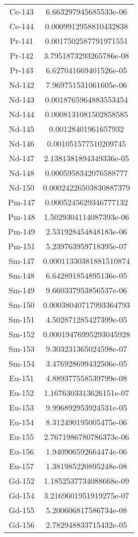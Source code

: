 \begin{table}[h!]
\begin{tabular}{|| c || c |}
Ce-143 & 6.663297945685533e-06 \\
Ce-144 & 0.0009912958810432838 \\
Pr-141 & 0.0017502587791971551 \\
Pr-142 & 3.7951873293265786e-08 \\
Pr-143 & 6.627041669401526e-05 \\
Nd-142 & 7.969751531061605e-06 \\
Nd-143 & 0.0018765964883553454 \\
Nd-144 & 0.0008131081502858585 \\
Nd-145 & 0.00128401961657932 \\
Nd-146 & 0.001051577510209745 \\
Nd-147 & 2.1381381894349336e-05 \\
Nd-148 & 0.0005958342076588777 \\
Nd-150 & 0.00024226503830887379 \\
Pm-147 & 0.0005245629346777132 \\
Pm-148 & 1.5029304114087393e-06 \\
Pm-149 & 2.531928454848183e-06 \\
Pm-151 & 5.239763959718395e-07 \\
Sm-147 & 0.00011330381881510874 \\
Sm-148 & 6.642891854895136e-05 \\
Sm-149 & 9.660337953856537e-06 \\
Sm-150 & 0.00038040717993364793 \\
Sm-151 & 4.502871285427399e-05 \\
Sm-152 & 0.00019476995293045928 \\
Sm-153 & 9.303231365024598e-07 \\
Sm-154 & 3.476928699432506e-05 \\
Eu-151 & 4.889377558539799e-08 \\
Eu-152 & 1.1676303313626151e-07 \\
Eu-153 & 9.996892953924531e-05 \\
Eu-154 & 8.312490195005475e-06 \\
Eu-155 & 2.7671986780786373e-06 \\
Eu-156 & 1.940906592664474e-06 \\
Eu-157 & 1.381985220895248e-08 \\
Gd-152 & 1.1852537734088668e-09 \\
Gd-154 & 3.2169601951919275e-07 \\
Gd-155 & 5.200606817586734e-08 \\
Gd-156 & 2.782948833715432e-05 \\

\end{tabular}
\end{table}
